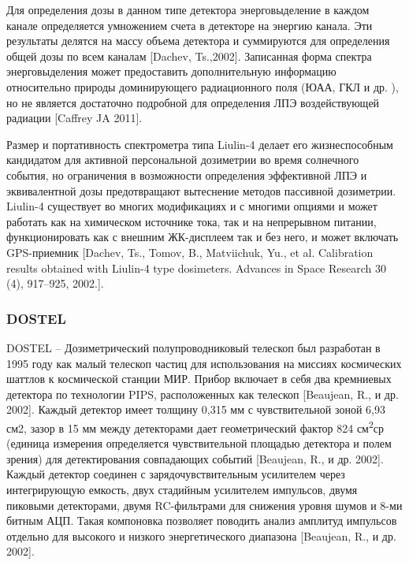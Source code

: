 Для определения дозы в данном типе детектора энерговыделение в каждом канале определяется умножением счета в детекторе на энергию канала. Эти результаты делятся на массу объема детектора и суммируются для определения общей дозы по всем каналам [Dachev, Ts.,2002]. Записанная форма спектра энерговыделения может предоставить дополнительную информацию относительно природы доминирующего радиационного поля (ЮАА, ГКЛ и др. ), но не является достаточно подробной для определения ЛПЭ воздействующей радиации [Caffrey JA 2011]. 


Размер и портативность спектрометра типа Liulin-4 делает его жизнеспособным кандидатом для активной персональной дозиметрии во время солнечного события, но ограничения в возможности определения эффективной ЛПЭ и эквивалентной дозы предотвращают вытеснение методов пассивной дозиметрии. Liulin-4 существует во многих модификациях и с многими опциями и может работать как на химическом источнике тока, так и на непрерывном питании, функционировать как с внешним ЖК-дисплеем так и без него, и может включать GPS-приемник [Dachev, Ts., Tomov, B., Matviichuk, Yu., et al. Calibration results obtained with Liulin-4 type dosimeters. Advances in Space Research 30 (4), 917--925, 2002.].	


\subsubsection{DOSTEL}

DOSTEL -- Дозиметрический полупроводниковый телескоп был разработан в 1995 году как малый телескоп частиц для использования на миссиях космических шаттлов к космической станции МИР. Прибор включает в себя два кремниевых детектора по технологии PIPS, расположенных как телескоп [Beaujean, R., и др. 2002]. Каждый детектор имеет толщину 0,315 мм с чувствительной зоной 6,93 см2, зазор в 15 мм между детекторами дает геометрический фактор 824 см\textsuperscript{2}ср (единица измерения определяется чувствительной площадью детектора и полем зрения) для детектирования совпадающих событий [Beaujean, R., и др. 2002]. Каждый детектор соединен с зарядочувствительным усилителем через интегрирующую емкость, двух стадийным усилителем импульсов, двумя пиковыми детекторами, двумя RC-фильтрами для снижения уровня шумов и 8-ми битным АЦП. Такая компоновка позволяет поводить анализ амплитуд импульсов отдельно для высокого и низкого энергетического диапазона [Beaujean, R., и др. 2002].


